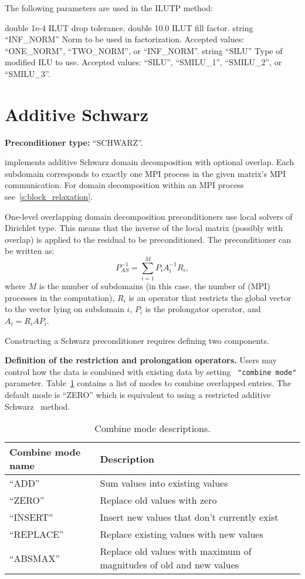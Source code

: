 The following parameters are used in the ILUTP method:

    {double}
    {1e-4}
    {ILUT drop tolerance.}
    {double}
    {10.0}
    {ILUT fill factor.}
    {string}
    {``INF\_NORM''}
    {Norm to be used in factorization. Accepted values: ``ONE\_NORM'', ``TWO\_NORM'', or ``INF\_NORM''.}
    {string}
    {``SILU''}
    {Type of modified ILU to use. Accepted values: ``SILU'', ``SMILU\_1'', ``SMILU\_2'', or ``SMILU\_3''.}


\section{Additive Schwarz}\label{s:schwarz}

\textbf{Preconditioner type:} ``SCHWARZ''.

\ifpacktwo{} implements additive Schwarz domain decomposition with optional
overlap. Each subdomain corresponds to exactly one MPI process in the given
matrix's MPI communication. For domain decomposition within an
MPI process see~\ref{s:block_relaxation}.

One-level overlapping domain decomposition preconditioners use local solvers of
Dirichlet type. This means that the inverse of the local matrix (possibly with
overlap) is applied to the residual to be preconditioned. The preconditioner can
be written as:
$$ P_{AS}^{-1} = \sum_{i=1}^M P_i A_i^{-1} R_i, $$
where $M$ is the number of subdomains (in this case, the number of (MPI)
processes in the computation), $R_i$ is an operator that restricts the global
vector to the vector lying on subdomain $i$, $P_i$ is the prolongator
operator, and $A_i = R_i A P_i$.

Constructing a Schwarz preconditioner requires defining two components.

{\bf Definition of the restriction and prolongation operators.}
Users may control how the data is combined with existing data by setting {\tt
"combine mode"} parameter. Table~\ref{t:combine_mode} contains a list of modes to
combine overlapped entries. The default mode is ``ZERO'' which is equivalent to
using a restricted additive Schwarz~\cite{Cai1999} method.

\begin{table}[htbp]
  \centering
  \begin{tabular}{p{3.5cm} p{12.0cm}}
    \toprule
    Combine mode name & Description \\
    \midrule
    ``ADD''           & Sum values into existing values \\
    ``ZERO''          & Replace old values with zero \\
    ``INSERT''        & Insert new values that don't currently exist \\
    ``REPLACE''       & Replace existing values with new values \\
    ``ABSMAX''        & Replace old values with maximum of magnitudes of old and new values \\
    \bottomrule
  \end{tabular}
  \caption{\label{t:combine_mode}Combine mode descriptions.}
\end{table}

